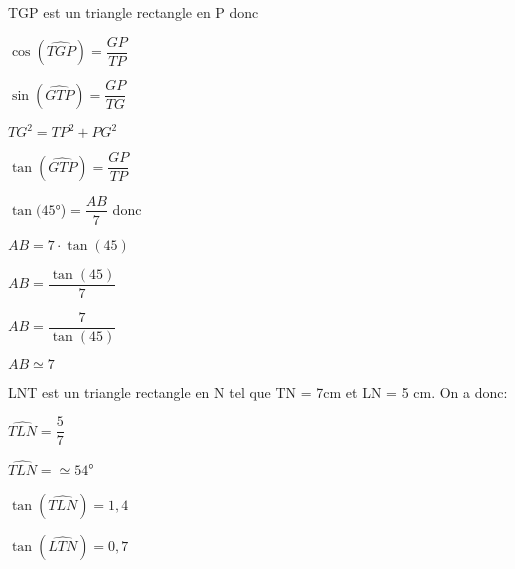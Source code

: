 
\begin{QCM}
  \begin{GroupeQCM}
    \begin{exercice}
      TGP est un triangle rectangle en P donc
      \begin{ChoixQCM}{4}
      \item $\cos(\widehat{TGP})=\dfrac{GP}{TP}$
      \item $\sin(\widehat{GTP})=\dfrac{GP}{TG}$
      \item $TG^2=TP^2+PG^2$
      \item $\tan(\widehat{GTP})=\dfrac{GP}{TP}$
      \end{ChoixQCM}
\begin{corrige}
   \end{corrige}
    \end{exercice}
    
    \begin{exercice}
     $\tan(45$°)$=\dfrac{AB}{7}$ donc 
      \begin{ChoixQCM}{4}
      \item $AB=7 \cdot \tan(45)$
      \item $AB=\dfrac{\tan(45)}{7}$
      \item $AB=\dfrac{7}{\tan(45)}$
      \item $AB \simeq 7$
      \end{ChoixQCM}
\begin{corrige}
   \end{corrige}
    \end{exercice}
    
        \begin{exercice}
     LNT est un triangle rectangle en N tel que TN = 7cm et LN = 5 cm.
On a donc:
      \begin{ChoixQCM}{4}
      \item $\widehat{TLN}=\dfrac{5}{7}$
      \item $\widehat{TLN}=\simeq 54$°
      \item $\tan(\widehat{TLN})=1,4$
      \item $\tan(\widehat{LTN})= 0,7$
      \end{ChoixQCM}
\begin{corrige}
   \end{corrige}
    \end{exercice}
    

\end{GroupeQCM}
\end{QCM}
